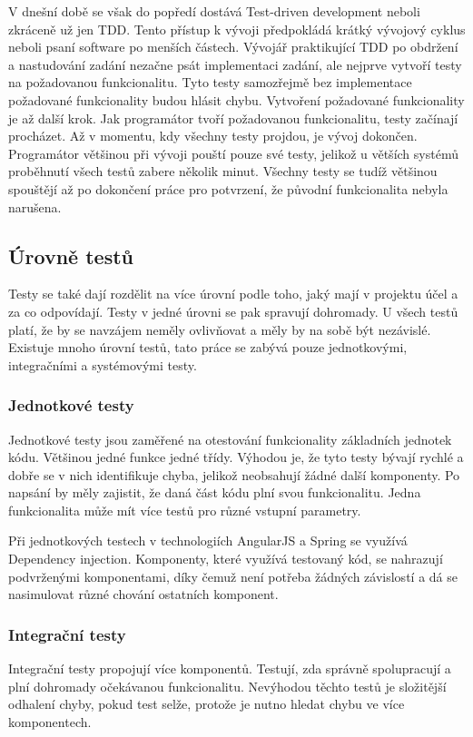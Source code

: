 \documentclass[czech,master,public,dept460,male,cpdeclaration,twoside]{diploma}
\begin{document}
V dnešní době se však do popředí dostává Test-driven development neboli zkráceně už jen TDD. Tento přístup k vývoji předpokládá krátký vývojový cyklus neboli psaní software po menších částech. Vývojář praktikující TDD po obdržení a nastudování zadání nezačne psát implementaci zadání, ale nejprve vytvoří testy na požadovanou funkcionalitu. Tyto testy samozřejmě bez implementace požadované funkcionality budou hlásit chybu. Vytvoření požadované funkcionality je až další krok. Jak programátor tvoří požadovanou funkcionalitu, testy začínají procházet. Až v momentu, kdy všechny testy projdou, je vývoj dokončen. Programátor většinou při vývoji pouští pouze své testy, jelikož u větších systémů proběhnutí všech testů zabere několik minut. Všechny testy se tudíž většinou spouštějí až po dokončení práce pro potvrzení, že původní funkcionalita nebyla narušena. \cite{tdd}

\subsection{Úrovně testů}
Testy se také dají rozdělit na více úrovní podle toho, jaký mají v projektu účel a za co odpovídají. Testy v jedné úrovni se pak spravují dohromady. U všech testů platí, že by se navzájem neměly ovlivňovat a měly by na sobě být nezávislé. Existuje mnoho úrovní testů, tato práce se zabývá pouze jednotkovými, integračními a systémovými testy. \cite{testlevels}

\subsubsection{Jednotkové testy}
Jednotkové testy jsou zaměřené na otestování funkcionality základních jednotek kódu. Většinou jedné funkce jedné třídy. Výhodou je, že tyto testy bývají rychlé a dobře se v nich identifikuje chyba, jelikož neobsahují žádné další komponenty. Po napsání by měly zajistit, že daná část kódu plní svou funkcionalitu. Jedna funkcionalita může mít více testů pro různé vstupní parametry.

Při jednotkových testech v technologiích AngularJS a Spring se využívá Dependency injection. Komponenty, které využívá testovaný kód, se nahrazují podvrženými komponentami, díky čemuž není potřeba žádných závislostí a dá se nasimulovat různé chování ostatních komponent.

\subsubsection{Integrační testy}
Integrační testy propojují více komponentů. Testují, zda správně spolupracují a plní dohromady očekávanou funkcionalitu. Nevýhodou těchto testů je složitější odhalení chyby, pokud test selže, protože je nutno hledat chybu ve více komponentech. 
\end{document}
